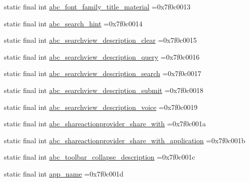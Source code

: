 \begin{DoxyCompactItemize}
\item 
static final int \mbox{\hyperlink{classcom_1_1example_1_1trainawearapplication_1_1_r_1_1string_ac91a5e09c13ca256993e1f0f761df575}{abc\+\_\+font\+\_\+family\+\_\+title\+\_\+material}} =0x7f0c0013
\item 
static final int \mbox{\hyperlink{classcom_1_1example_1_1trainawearapplication_1_1_r_1_1string_af12a5d8555910b9c138a4606f45c2e13}{abc\+\_\+search\+\_\+hint}} =0x7f0c0014
\item 
static final int \mbox{\hyperlink{classcom_1_1example_1_1trainawearapplication_1_1_r_1_1string_ae29eb7972ab051ba45d0044785de8cb0}{abc\+\_\+searchview\+\_\+description\+\_\+clear}} =0x7f0c0015
\item 
static final int \mbox{\hyperlink{classcom_1_1example_1_1trainawearapplication_1_1_r_1_1string_a735202c09d6e19baaa80d5536aca3828}{abc\+\_\+searchview\+\_\+description\+\_\+query}} =0x7f0c0016
\item 
static final int \mbox{\hyperlink{classcom_1_1example_1_1trainawearapplication_1_1_r_1_1string_a051e3639d9a66e6cddb4e90022fb74ea}{abc\+\_\+searchview\+\_\+description\+\_\+search}} =0x7f0c0017
\item 
static final int \mbox{\hyperlink{classcom_1_1example_1_1trainawearapplication_1_1_r_1_1string_aa429a580b960490d07e211be497bf153}{abc\+\_\+searchview\+\_\+description\+\_\+submit}} =0x7f0c0018
\item 
static final int \mbox{\hyperlink{classcom_1_1example_1_1trainawearapplication_1_1_r_1_1string_a186152e48861eac053d40ea64ca48107}{abc\+\_\+searchview\+\_\+description\+\_\+voice}} =0x7f0c0019
\item 
static final int \mbox{\hyperlink{classcom_1_1example_1_1trainawearapplication_1_1_r_1_1string_a173a41d4fc00e761a3b86a0eba572b86}{abc\+\_\+shareactionprovider\+\_\+share\+\_\+with}} =0x7f0c001a
\item 
static final int \mbox{\hyperlink{classcom_1_1example_1_1trainawearapplication_1_1_r_1_1string_aeccd547771aa65c3b5af530b4ab4548a}{abc\+\_\+shareactionprovider\+\_\+share\+\_\+with\+\_\+application}} =0x7f0c001b
\item 
static final int \mbox{\hyperlink{classcom_1_1example_1_1trainawearapplication_1_1_r_1_1string_a7ff404b524881a1f00742ca29ee87f8d}{abc\+\_\+toolbar\+\_\+collapse\+\_\+description}} =0x7f0c001c
\item 
static final int \mbox{\hyperlink{classcom_1_1example_1_1trainawearapplication_1_1_r_1_1string_aeee63aeeda083763149218a13a70c897}{app\+\_\+name}} =0x7f0c001d
\item 

\end{DoxyCompactItemize}
